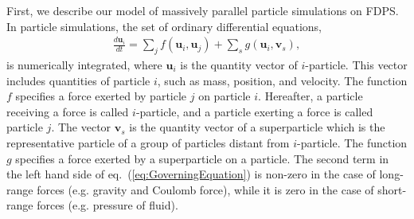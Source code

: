 First, we describe our model of massively parallel particle
simulations on FDPS. In particle simulations, the set of ordinary
differential equations,
\begin{align}
    \frac{d\bm{u}_i}{dt} = \sum_j f(\bm{u}_i,\bm{u}_j) + \sum_s
    g(\bm{u}_i,\bm{v}_s), \label{eq:GoverningEquation}
\end{align}
is numerically integrated, where $\bm{u}_i$ is the quantity vector of
$i$-particle. This vector includes quantities of particle $i$, such as
mass, position, and velocity. The function $f$ specifies a force
exerted by particle $j$ on particle $i$. Hereafter, a particle
receiving a force is called $i$-particle, and a particle exerting a
force is called particle $j$. The vector $\bm{v}_s$ is the quantity
vector of a superparticle which is the representative particle of a
group of particles distant from $i$-particle. The function $g$
specifies a force exerted by a superparticle on a particle. The second
term in the left hand side of eq.~(\ref{eq:GoverningEquation}) is
non-zero in the case of long-range forces (e.g. gravity and Coulomb
force), while it is zero in the case of short-range forces
(e.g. pressure of fluid).

